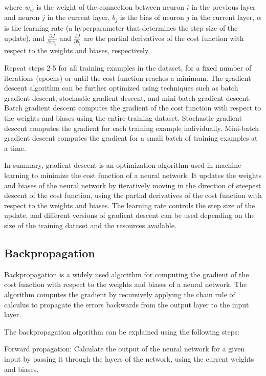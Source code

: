 where $w_{ij}$ is the weight of the connection between neuron $i$ in the previous layer and neuron $j$ in the current layer, $b_{j}$ is the bias of neuron $j$ in the current layer, $\alpha$ is the learning rate (a hyperparameter that determines the step size of the update), and $\frac{\partial J}{\partial w_{ij}}$ and $\frac{\partial J}{\partial b_{j}}$ are the partial derivatives of the cost function with respect to the weights and biases, respectively.

Repeat steps 2-5 for all training examples in the dataset, for a fixed number of iterations (epochs) or until the cost function reaches a minimum.
The gradient descent algorithm can be further optimized using techniques such as batch gradient descent, stochastic gradient descent, and mini-batch gradient descent. Batch gradient descent computes the gradient of the cost function with respect to the weights and biases using the entire training dataset. Stochastic gradient descent computes the gradient for each training example individually. Mini-batch gradient descent computes the gradient for a small batch of training examples at a time.

In summary, gradient descent is an optimization algorithm used in machine learning to minimize the cost function of a neural network. It updates the weights and biases of the neural network by iteratively moving in the direction of steepest descent of the cost function, using the partial derivatives of the cost function with respect to the weights and biases. The learning rate controls the step size of the update, and different versions of gradient descent can be used depending on the size of the training dataset and the resources available.


\subsection{Backpropagation}

Backpropagation is a widely used algorithm for computing the gradient of the cost function with respect to the weights and biases of a neural network. The algorithm computes the gradient by recursively applying the chain rule of calculus to propagate the errors backwards from the output layer to the input layer.

The backpropagation algorithm can be explained using the following steps:

Forward propagation: Calculate the output of the neural network for a given input by passing it through the layers of the network, using the current weights and biases.

